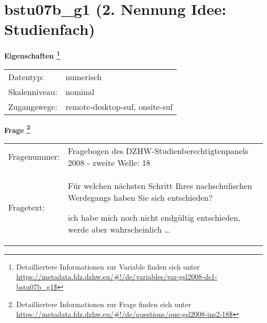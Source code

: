 
    \setcounter{footnote}{0}

    \vspace*{-1.8cm}
	\section{bstu07b\_g1 (2. Nennung Idee: Studienfach)}
	\label{section:bstu07b_g1}



    \vspace*{0.5cm}
    \noindent\textbf{Eigenschaften
	\footnote{Detailliertere Informationen zur Variable finden sich unter
		\url{https://metadata.fdz.dzhw.eu/\#!/de/variables/var-gsl2008-ds1-bstu07b_g1$}}}\\
	\begin{tabularx}{\hsize}{@{}lX}
	Datentyp: & numerisch \\
	Skalenniveau: & nominal \\
	Zugangswege: &
	  remote-desktop-suf, 
	  onsite-suf
 \\
    \end{tabularx}



				\vspace*{0.5cm}
                \noindent\textbf{Frage
	                \footnote{Detailliertere Informationen zur Frage finden sich unter
		              \url{https://metadata.fdz.dzhw.eu/\#!/de/questions/que-gsl2008-ins2-18$}}}\\
				\begin{tabularx}{\hsize}{@{}lX}
					Fragenummer: &
					  Fragebogen des DZHW-Studienberechtigtenpanels 2008 - zweite Welle:
					  18
 \\
					Fragetext: & Für welchen nächsten Schritt Ihres nachschulischen Werdegangs haben Sie sich entschieden?\par  ich habe mich noch nicht endgültig entschieden, werde aber wahrscheinlich … \\
				\end{tabularx}






